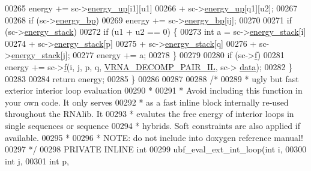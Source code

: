 \begin{DoxyCode}
00265       energy += sc->\hyperlink{group__soft__constraints_a57e4dbb924ab11f304e3762a3a9b07a1}{energy\_up}[i1][u1]
00266                 + sc->\hyperlink{group__soft__constraints_a57e4dbb924ab11f304e3762a3a9b07a1}{energy\_up}[q1][u2];
00267 
00268     \textcolor{keywordflow}{if} (sc->\hyperlink{group__soft__constraints_ad139b8e06632e00cbcf3909815d0d03d}{energy\_bp})
00269       energy += sc->\hyperlink{group__soft__constraints_ad139b8e06632e00cbcf3909815d0d03d}{energy\_bp}[ij];
00270 
00271     \textcolor{keywordflow}{if} (sc->\hyperlink{group__soft__constraints_ac20dded6068e81acd0f1139092f66a22}{energy\_stack})
00272       \textcolor{keywordflow}{if} (u1 + u2 == 0) \{
00273         \textcolor{keywordtype}{int} a = sc->\hyperlink{group__soft__constraints_ac20dded6068e81acd0f1139092f66a22}{energy\_stack}[i]
00274                 + sc->\hyperlink{group__soft__constraints_ac20dded6068e81acd0f1139092f66a22}{energy\_stack}[p]
00275                 + sc->\hyperlink{group__soft__constraints_ac20dded6068e81acd0f1139092f66a22}{energy\_stack}[q]
00276                 + sc->\hyperlink{group__soft__constraints_ac20dded6068e81acd0f1139092f66a22}{energy\_stack}[j];
00277         energy += a;
00278       \}
00279 
00280     \textcolor{keywordflow}{if} (sc->\hyperlink{group__soft__constraints_a32dc86090237888c75491bbd4861a04b}{f})
00281       energy += sc->\hyperlink{group__soft__constraints_a32dc86090237888c75491bbd4861a04b}{f}(i, j, p, q, \hyperlink{group__constraints_gaeab04f34d7730cff2d651d782f95d857}{VRNA\_DECOMP\_PAIR\_IL}, sc->
      \hyperlink{group__soft__constraints_a7574680143df97b9029146c2150bf06d}{data});
00282   \}
00283 
00284   \textcolor{keywordflow}{return} energy;
00285 \}
00286 
00287 
00288 \textcolor{comment}{/*}
00289 \textcolor{comment}{ *  ugly but fast exterior interior loop evaluation}
00290 \textcolor{comment}{ *}
00291 \textcolor{comment}{ *  Avoid including this function in your own code. It only serves}
00292 \textcolor{comment}{ *  as a fast inline block internally re-used throughout the RNAlib. It}
00293 \textcolor{comment}{ *  evalutes the free energy of interior loops in single sequences or sequence}
00294 \textcolor{comment}{ *  hybrids. Soft constraints are also applied if available.}
00295 \textcolor{comment}{ *}
00296 \textcolor{comment}{ *  NOTE: do not include into doxygen reference manual!}
00297 \textcolor{comment}{ */}
00298 PRIVATE INLINE \textcolor{keywordtype}{int}
00299 ubf\_eval\_ext\_int\_loop(\textcolor{keywordtype}{int}           i,
00300                       \textcolor{keywordtype}{int}           j,
00301                       \textcolor{keywordtype}{int}           p,

\end{DoxyCode}
